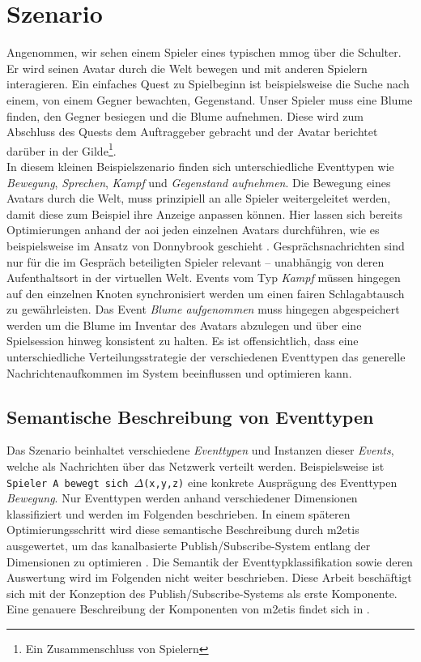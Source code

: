 \section{Szenario}
\label{chap:grundlagen:szenario}
Angenommen, wir sehen einem Spieler eines typischen \ac{mmog} über die Schulter. Er wird seinen Avatar durch die Welt bewegen und mit anderen Spielern interagieren. Ein einfaches Quest zu Spielbeginn ist beispielsweise die Suche nach einem, von einem Gegner bewachten, Gegenstand. Unser Spieler muss eine Blume finden, den Gegner besiegen und die Blume aufnehmen. Diese wird zum Abschluss des Quests dem Auftraggeber gebracht und der Avatar berichtet darüber in der Gilde\footnote{Ein Zusammenschluss von Spielern}.\\
In diesem kleinen Beispielszenario finden sich unterschiedliche Eventtypen wie \emph{Bewegung}, \emph{Sprechen}, \emph{Kampf} und \emph{Gegenstand aufnehmen}. Die Bewegung eines Avatars durch die Welt, muss prinzipiell an alle Spieler weitergeleitet werden, damit diese zum Beispiel ihre Anzeige anpassen können. Hier lassen sich bereits Optimierungen anhand der \ac{aoi} jeden einzelnen Avatars durchführen, wie es beispielsweise im Ansatz von Donnybrook geschieht \cite{Bharambe2008Donnybrook}. Gesprächsnachrichten sind nur für die im Gespräch beteiligten Spieler relevant -- unabhängig von deren Aufenthaltsort in der virtuellen Welt. Events vom Typ \emph{Kampf} müssen hingegen auf den einzelnen Knoten synchronisiert werden um einen fairen Schlagabtausch zu gewährleisten. Das Event \emph{Blume aufgenommen} muss hingegen abgespeichert werden um die Blume im Inventar des Avatars abzulegen und über eine Spielsession hinweg konsistent zu halten. Es ist offensichtlich, dass eine unterschiedliche Verteilungsstrategie der verschiedenen Eventtypen das generelle Nachrichtenaufkommen im System beeinflussen und optimieren kann.

\subsection{Semantische Beschreibung von Eventtypen}
Das Szenario beinhaltet verschiedene \emph{Eventtypen} und Instanzen dieser \emph{Events}, welche als Nachrichten über das Netzwerk verteilt werden. Beispielsweise ist \texttt{Spieler A bewegt sich $\Delta$(x,y,z)} eine konkrete Ausprägung des Eventtypen \emph{Bewegung}. Nur Eventtypen werden anhand verschiedener Dimensionen klassifiziert und werden im Folgenden beschrieben. In einem späteren Optimierungsschritt wird diese semantische Beschreibung durch \ac{m2etis} ausgewertet, um das kanalbasierte Publish/Subscribe-System entlang der Dimensionen zu optimieren \cite{Fischer2010a}. Die Semantik der Eventtypklassifikation sowie deren Auswertung wird im Folgenden nicht weiter beschrieben. Diese Arbeit beschäftigt sich mit der Konzeption des Publish/Subscribe-Systems als erste Komponente. Eine genauere Beschreibung der Komponenten von \ac{m2etis} findet sich in .

